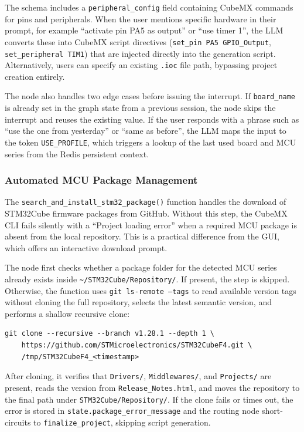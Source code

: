 The schema includes a \texttt{peripheral\_config} field containing CubeMX commands for pins and peripherals. When the user mentions specific hardware in their prompt, for example ``activate pin PA5 as output'' or ``use timer 1'', the LLM converts these into CubeMX script directives (\texttt{set\_\allowbreak pin PA5 GPIO\_\allowbreak Output}, \texttt{set\_peripheral TIM1}) that are injected directly into the generation script. Alternatively, users can specify an existing \texttt{.ioc} file path, bypassing project creation entirely.

The node also handles two edge cases before issuing the interrupt. If \texttt{board\_name} is already set in the graph state from a previous session, the node skips the interrupt and reuses the existing value. If the user responds with a phrase such as ``use the one from yesterday'' or ``same as before'', the LLM maps the input to the token \texttt{USE\_PROFILE}, which triggers a lookup of the last used board and MCU series from the Redis persistent context.

\subsubsection{Automated MCU Package Management}

The \texttt{search\_\allowbreak and\_\allowbreak install\_\allowbreak stm32\_\allowbreak package()} function handles the download of STM32Cube firmware packages from GitHub. Without this step, the CubeMX CLI fails silently with a ``Project loading error'' when a required MCU package is absent from the local repository. This is a practical difference from the GUI, which offers an interactive download prompt.

The node first checks whether a package folder for the detected MCU series already exists inside \texttt{\textasciitilde/STM32Cube/Repository/}. If present, the step is skipped. Otherwise, the function uses \texttt{git ls-remote --tags} to read available version tags without cloning the full repository, selects the latest semantic version, and performs a shallow recursive clone:

\begin{verbatim}
git clone --recursive --branch v1.28.1 --depth 1 \
    https://github.com/STMicroelectronics/STM32CubeF4.git \
    /tmp/STM32CubeF4_<timestamp>
\end{verbatim}

After cloning, it verifies that \texttt{Drivers/}, \texttt{Middlewares/}, and \texttt{Projects/} are present, reads the version from \texttt{Release\_Notes.html}, and moves the repository to the final path under \texttt{STM32Cube/Repository/}. If the clone fails or times out, the error is stored in \texttt{state.package\_\allowbreak error\_\allowbreak message} and the routing node short-circuits to \texttt{finalize\_project}, skipping script generation.


